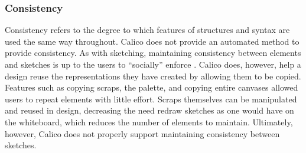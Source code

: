 \subsubsection{Consistency}
Consistency refers to the degree to which features of structures and syntax are used the same way throughout. Calico does not provide an automated method to provide consistency. As with sketching, maintaining consistency between elements and sketches is up to the users to ``socially'' enforce \cite{Petre2013BookChapter}. Calico does, however, help a design reuse the representations they have created by allowing them to be copied. Features such as copying scraps, the palette, and copying entire canvases allowed users to repeat elements with little effort. Scraps themselves can be manipulated and reused in design, decreasing the need redraw sketches as one would have on the whiteboard, which reduces the number of elements to maintain. Ultimately, however, Calico does not properly support maintaining consistency between sketches.



